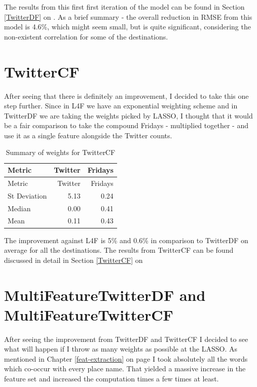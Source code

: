 \documentclass[minf,frontabs,twoside,singlespacing,parskip]{infthesis}
\begin{document}
The results from this first first iteration of the model can be found in Section \ref{TwitterDF} on \pageref{TwitterDF}. As a brief summary - the overall reduction in RMSE from this model is 4.6\%, which might seem small, but is quite significant, considering the non-existent correlation for some of the destinations.


\section{TwitterCF}


After seeing that there is definitely an improvement, I decided to take this one step further. Since in L4F we have an exponential weighting scheme and in TwitterDF we are taking the weights picked by LASSO, I thought that it would be a fair comparison to take the compound Fridays - multiplied together - and use it as a single feature alongside the Twitter counts. 

\begin{table}[h]
\begin{center}
\begin{tabular}{ l | r | r }
\textbf{Metric} & \textbf{Twitter} & \textbf{Fridays}\\
\hline
Metric & Twitter & Fridays\\
St Deviation & 5.13 & 0.24\\
Median & 0.00 & 0.41\\
Mean & 0.11 & 0.43
\end{tabular}
\end{center}
\caption{Summary of weights for TwitterCF}
\end{table}

The improvement against L4F is 5\% and 0.6\% in comparison to TwitterDF on average for all the destinations. The results from TwitterCF can be found discussed in detail in Section \ref{TwitterCF} on \pageref{TwitterCF}


\section{MultiFeatureTwitterDF and MultiFeatureTwitterCF}


After seeing the improvement from TwitterDF and TwitterCF I decided to see what will happen if I throw as many weights as possible at the LASSO. As mentioned in Chapter \ref{feat-extraction} on page \pageref{feat-extraction} I took absolutely all the words which co-occur with every place name. That yielded a massive increase in the feature set and increased the computation times a few times at least.
\end{document}

